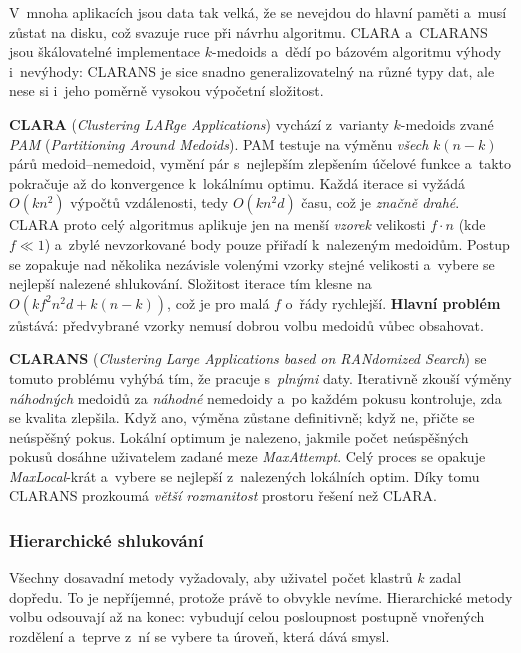 \documentclass[11pt,a4paper]{article}
\theoremstyle{definition}
\begin{document}
\begin{defbox}
V~mnoha aplikacích jsou data tak velká, že se nevejdou do hlavní paměti a~musí zůstat na
disku, což svazuje ruce při návrhu algoritmu. CLARA a~CLARANS jsou škálovatelné implementace
$k$-medoids a~dědí po bázovém algoritmu výhody i~nevýhody: CLARANS je sice snadno
generalizovatelný na různé typy dat, ale nese si i~jeho poměrně vysokou výpočetní složitost.

\textbf{CLARA} (\emph{Clustering LARge Applications}) vychází z~varianty $k$-medoids zvané
\emph{PAM} (\emph{Partitioning Around Medoids}). PAM testuje na výměnu \emph{všech} $k(n-k)$
párů medoid--nemedoid, vymění pár s~nejlepším zlepšením účelové funkce a~takto pokračuje až do
konvergence k~lokálnímu optimu. Každá iterace si vyžádá $O(kn^2)$ výpočtů vzdálenosti, tedy
$O(kn^2d)$ času, což je \emph{značně drahé}. CLARA proto celý algoritmus aplikuje jen na menší
\emph{vzorek} velikosti $f\cdot n$ (kde $f\ll 1$) a~zbylé nevzorkované body pouze přiřadí
k~nalezeným medoidům. Postup se zopakuje nad několika nezávisle volenými vzorky stejné
velikosti a~vybere se nejlepší nalezené shlukování. Složitost iterace tím klesne na
$O(kf^2n^2d+k(n-k))$, což je pro malá $f$ o~řády rychlejší. \textbf{Hlavní problém} zůstává:
předvybrané vzorky nemusí dobrou volbu medoidů vůbec obsahovat.

\textbf{CLARANS} (\emph{Clustering Large Applications based on RANdomized Search}) se tomuto
problému vyhýbá tím, že pracuje s~\emph{plnými} daty. Iterativně zkouší výměny \emph{náhodných}
medoidů za \emph{náhodné} nemedoidy a~po každém pokusu kontroluje, zda se kvalita zlepšila.
Když ano, výměna zůstane definitivně; když ne, přičte se neúspěšný pokus. Lokální optimum je
nalezeno, jakmile počet neúspěšných pokusů dosáhne uživatelem zadané meze \emph{MaxAttempt}.
Celý proces se opakuje \emph{MaxLocal}-krát a~vybere se nejlepší z~nalezených lokálních optim.
Díky tomu CLARANS prozkoumá \emph{větší rozmanitost} prostoru řešení než CLARA.
\end{defbox}

\subsubsection{Hierarchické shlukování}

Všechny dosavadní metody vyžadovaly, aby uživatel počet klastrů $k$ zadal dopředu. To je
nepříjemné, protože právě to obvykle nevíme. Hierarchické metody volbu odsouvají až na
konec: vybudují celou posloupnost postupně vnořených rozdělení a~teprve z~ní se vybere ta
úroveň, která dává smysl.
\end{document}
